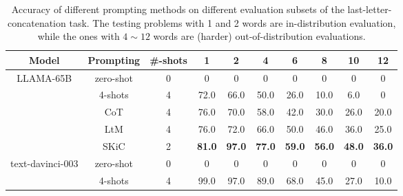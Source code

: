 \begin{table}[th]
 \caption{Accuracy of different prompting methods on different evaluation subsets of the last-letter-concatenation task. The testing problems with 1 and 2 words are in-distribution evaluation, while the ones with $4\sim 12$ words are (harder) out-of-distribution evaluations. } \label{Tab:last_letter_results}
\centering
\small
\begin{tabular}{c|c|c|cc|ccccc} \toprule
\textbf{Model}                & \textbf{Prompting} &\textbf{\#-shots}     & \multicolumn{1}{c}{\textbf{1}} & \multicolumn{1}{c|}{\textbf{2}} & \multicolumn{1}{c}{\textbf{4}} & \multicolumn{1}{c}{\textbf{6}} & \multicolumn{1}{c}{\textbf{8}} & \multicolumn{1}{c}{\textbf{10}} & \multicolumn{1}{c}{\textbf{12}} \\ \midrule \midrule
\multirow{5}{*}{LLAMA-65B} & zero-shot  &0        & 0                     & 0                     & 0                     & 0                     & 0                     & 0                      & 0                      \\
                           & 4-shots   &4      & 72.0                    & 66.0                    & 50.0                    & 26.0                    & 10.0                   & 6.0                      & 0                      \\
                           & CoT   &4        & 76.0                    & 70.0                    & 58.0                    & 42.0                    & 30.0                    & 26.0                     & 20.0                     \\
                           & LtM &4  & 76.0                    & 72.0                    & 66.0                   & 50.0                   & 46.0                    & 36.0                     & 25.0                     \\
                           & SKiC  &2 & \textbf{81.0}           & \textbf{97.0}           & \textbf{77.0}           & \textbf{59.0}           & \textbf{56.0}           & \textbf{48.0}            & \textbf{36.0}            \\  \midrule
\multirow{5}{*}{text-davinci-003}  & zero-shot   &0        & 0                     & 0                     & 0                     & 0                     & 0                     & 0                      & 0                      \\
                           & 4-shots  &4     & 99.0                    & 97.0                    & 89.0                    & 68.0                    & 45.0                    & 27.0                     & 10.0                     \\

\end{tabular}
\end{table}
